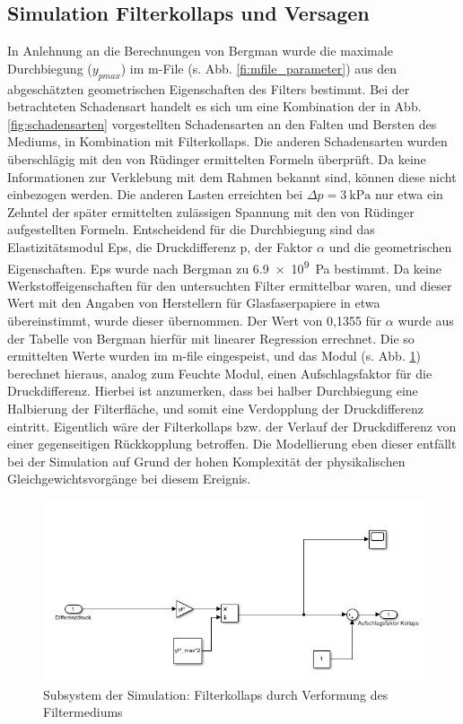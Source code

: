     \subsection{Simulation Filterkollaps und Versagen}
    In Anlehnung an die Berechnungen von Bergman \cite{hepa} wurde die maximale Durchbiegung ($y_{pmax}$) im m-File (s. Abb. \ref{fi:mfile_parameter}) aus den abgeschätzten geometrischen Eigenschaften des Filters bestimmt. Bei der betrachteten Schadensart handelt es sich um eine Kombination der in Abb. \ref{fig:schadensarten} vorgestellten Schadensarten an den Falten und Bersten des Mediums, in Kombination mit Filterkollaps. Die anderen Schadensarten wurden überschlägig mit den von Rüdinger \cite{rudinger} ermittelten Formeln überprüft. Da keine Informationen zur Verklebung mit dem Rahmen bekannt sind, können diese nicht einbezogen werden. Die anderen Lasten erreichten bei $ \Delta p = \SI{3}{\kilo\pascal}$ nur etwa ein Zehntel der später ermittelten zulässigen Spannung mit den von Rüdinger aufgestellten Formeln.
    Entscheidend für die Durchbiegung sind das Elastizitätsmodul \ac{Eps}, die Druckdifferenz \ac{p}, der Faktor $\alpha$ und die geometrischen Eigenschaften. 
    \ac{Eps} wurde nach Bergman zu \SI{6,9e9}{\pascal} bestimmt. 
    Da keine Werkstoffeigenschaften für den untersuchten Filter ermittelbar waren, und dieser Wert mit den Angaben von Herstellern für Glasfaserpapiere in etwa übereinstimmt, wurde dieser übernommen. 
    Der Wert von 0,1355 für $\alpha$ wurde aus der Tabelle von Bergman hierfür mit linearer Regression errechnet. Die so ermittelten Werte wurden im m-file eingespeist, und das Modul (s. Abb. \ref{fi:sim_kollaps}) berechnet hieraus, analog zum Feuchte Modul, einen Aufschlagsfaktor für die Druckdifferenz. 
    Hierbei ist anzumerken, dass bei halber Durchbiegung eine Halbierung der Filterfläche, und somit eine Verdopplung der Druckdifferenz eintritt. 
    Eigentlich wäre der Filterkollaps bzw. der Verlauf der Druckdifferenz von einer gegenseitigen Rückkopplung betroffen. 
    Die Modellierung eben dieser entfällt bei der Simulation auf Grund der hohen Komplexität der physikalischen Gleichgewichtsvorgänge bei diesem Ereignis.
    \begin{figure}[H]
        \begin{center}
            \includegraphics[width=\linewidth]{images/sim_kollaps.png}
            \caption[Subsystem Filterkollaps]{Subsystem der Simulation: Filterkollaps durch Verformung des Filtermediums}
            \label{fi:sim_kollaps}
        \end{center}
    \end{figure}
